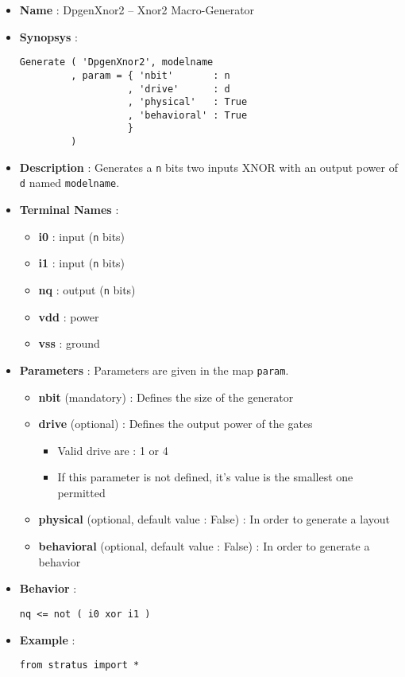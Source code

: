 \begin{itemize}
    \item \textbf{Name} : DpgenXnor2 -- Xnor2 Macro-Generator
    \item \textbf{Synopsys} :
\begin{verbatim}
Generate ( 'DpgenXnor2', modelname
         , param = { 'nbit'       : n
                   , 'drive'      : d
                   , 'physical'   : True
                   , 'behavioral' : True                   
                   }
         )
\end{verbatim}
    \item \textbf{Description} : Generates a \verb-n- bits two inputs XNOR with an output power of \verb-d- named \verb-modelname-.
    \item \textbf{Terminal Names} :
    \begin{itemize}
        \item \textbf{i0} : input (\verb-n- bits)
        \item \textbf{i1} : input (\verb-n- bits)
        \item \textbf{nq} : output (\verb-n- bits)
        \item \textbf{vdd} : power
        \item \textbf{vss} : ground
    \end{itemize}
    \item \textbf{Parameters} : Parameters are given in the map \verb-param-.
    \begin{itemize}
        \item \textbf{nbit} (mandatory) : Defines the size of the generator
        \item \textbf{drive} (optional) : Defines the output power of the gates
        \begin{itemize}
            \item Valid drive are : 1 or 4
            \item If this parameter is not defined, it's value is the smallest one permitted
        \end{itemize}
        \item \textbf{physical} (optional, default value : False) : In order to generate a layout
        \item \textbf{behavioral} (optional, default value : False) : In order to generate a behavior        
    \end{itemize}
    \item \textbf{Behavior} :
\begin{verbatim}
nq <= not ( i0 xor i1 )
\end{verbatim}
    \item \textbf{Example} :
\begin{verbatim}
from stratus import *


\end{verbatim}
\end{itemize}
